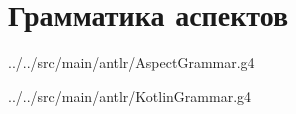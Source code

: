 \chapter{Грамматика аспектов}


{../../src/main/antlr/AspectGrammar.g4}


{../../src/main/antlr/KotlinGrammar.g4}